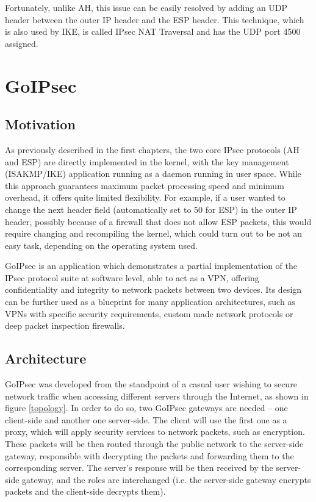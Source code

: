 \documentclass[a4paper,12pt]{report}
\begin{document}
		Fortunately, unlike AH, this issue can be easily resolved by adding an UDP header between the outer IP header and the ESP header. This technique, which is also used by IKE, is called IPsec NAT Traversal and has the UDP port 4500 assigned.
		
		\chapter{GoIPsec}
		\section{Motivation}
		As previously described in the first chapters, the two core IPsec protocols (AH and ESP) are directly implemented in the kernel, with the key management (ISAKMP/IKE) application running as a daemon running in user space. While this approach guarantees maximum packet processing speed and minimum overhead, it offers quite limited flexibility. For example, if a user wanted to change the next header field (automatically set to 50 for ESP) in the outer IP header, possibly because of a firewall that does not allow ESP packets, this would require changing and recompiling the kernel, which could turn out to be not an easy task, depending on the operating system used.
		
		GoIPsec is an application which demonstrates a partial implementation of the IPsec protocol suite at software level, able to act as a VPN, offering confidentiality and integrity to network packets between two devices. Its design can be further used as a blueprint for many application architectures, such as VPNs with specific security requirements, custom made network protocols or deep packet inspection firewalls.
		
		\section{Architecture}
		GoIPsec was developed from the standpoint of a casual user wishing to secure network traffic when accessing different servers through the Internet, as shown in figure \ref{topology}. In order to do so, two GoIPsec gateways are needed -- one client-side and another one server-side. The client will use the first one as a proxy, which will apply security services to network packets, such as encryption. These packets will be then routed through the public network to the server-side gateway, responsible with decrypting the packets and forwarding them to the corresponding server. The server's response will be then received by the server-side gateway, and the roles are interchanged (i.e. the server-side gateway encrypts packets and the client-side decrypts them).
		
\end{document}
